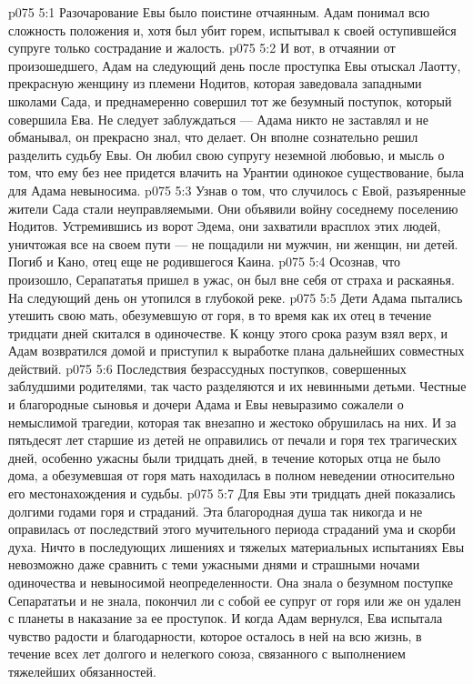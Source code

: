 \vs p075 5:1 Разочарование Евы было поистине отчаянным. Адам понимал всю сложность положения и, хотя был убит горем, испытывал к своей оступившейся супруге только сострадание и жалость.
\vs p075 5:2 И вот, в отчаянии от произошедшего, Адам на следующий день после проступка Евы отыскал Лаотту, прекрасную женщину из племени Нодитов, которая заведовала западными школами Сада, и преднамеренно совершил тот же безумный поступок, который совершила Ева. Не следует заблуждаться --- Адама никто не заставлял и не обманывал, он прекрасно знал, что делает. Он вполне сознательно решил разделить судьбу Евы. Он любил свою супругу неземной любовью, и мысль о том, что ему без нее придется влачить на Урантии одинокое существование, была для Адама невыносима.
\vs p075 5:3 Узнав о том, что случилось с Евой, разъяренные жители Сада стали неуправляемыми. Они объявили войну соседнему поселению Нодитов. Устремившись из ворот Эдема, они захватили врасплох этих людей, уничтожая все на своем пути --- не пощадили ни мужчин, ни женщин, ни детей. Погиб и Кано, отец еще не родившегося Каина.
\vs p075 5:4 Осознав, что произошло, Серапататья пришел в ужас, он был вне себя от страха и раскаянья. На следующий день он утопился в глубокой реке.
\vs p075 5:5 Дети Адама пытались утешить свою мать, обезумевшую от горя, в то время как их отец в течение тридцати дней скитался в одиночестве. К концу этого срока разум взял верх, и Адам возвратился домой и приступил к выработке плана дальнейших совместных действий.
\vs p075 5:6 Последствия безрассудных поступков, совершенных заблудшими родителями, так часто разделяются и их невинными детьми. Честные и благородные сыновья и дочери Адама и Евы невыразимо сожалели о немыслимой трагедии, которая так внезапно и жестоко обрушилась на них. И за пятьдесят лет старшие из детей не оправились от печали и горя тех трагических дней, особенно ужасны были тридцать дней, в течение которых отца не было дома, а обезумевшая от горя мать находилась в полном неведении относительно его местонахождения и судьбы.
\vs p075 5:7 Для Евы эти тридцать дней показались долгими годами горя и страданий. Эта благородная душа так никогда и не оправилась от последствий этого мучительного периода страданий ума и скорби духа. Ничто в последующих лишениях и тяжелых материальных испытаниях Евы невозможно даже сравнить с теми ужасными днями и страшными ночами одиночества и невыносимой неопределенности. Она знала о безумном поступке Сепарататьи и не знала, покончил ли с собой ее супруг от горя или же он удален с планеты в наказание за ее проступок. И когда Адам вернулся, Ева испытала чувство радости и благодарности, которое осталось в ней на всю жизнь, в течение всех лет долгого и нелегкого союза, связанного с выполнением тяжелейших обязанностей.
